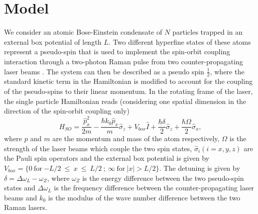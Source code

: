 \documentclass[12pt]{iopart}
\begin{document}
\section{Model}
\label{Sec:Model}

We consider an atomic Bose-Einstein condensate of $N$ particles trapped in an external box potential of length $L$. Two different hyperfine states of these atoms represent a pseudo-spin that is used to implement the spin-orbit coupling interaction through a two-photon Raman pulse from two counter-propagating laser beams \cite{spielman_2009}. The system can then be described as a pseudo spin $\frac{1}{2}$, where the standard kinetic term in the Hamiltonian is modified to  account for the coupling of the pseudo-spins to their linear momentum. In the rotating frame of the laser, the single particle Hamiltonian reads (considering one spatial dimension in the direction of the spin-orbit coupling only) \cite{Pitaevskiistringari2016}
\begin{equation}
    H_{SO}=\frac{\hat{p}_x^2}{2m}-\frac{\hbar k_0 \hat{p}_x}{m}\hat{\sigma}_z+V_{{box}}\hat{I}+\frac{\hbar \delta}{2}\hat{\sigma}_z+\frac{\hbar \Omega}{2}
    \hat{\sigma}_x,
\end{equation}
where  ${p}$ and $m$ are the momentum and mass of the atom respectively,  $\Omega$ is the strength of the laser beams which couple the two spin states, $\hat\sigma_i (i=x,y,z)$ are the Pauli spin operators and the external box potential is given by $V_{box}=\{0~\textrm{for}~{-L/2}~\leq~x~\leq~L/2~; ~\infty~\textrm{for}~|x|>L/2\}$. The detuning is  given by $\delta=\Delta \omega_L-\omega_Z$, where $\omega_Z$ is the energy difference between the two pseudo-spin states and $\Delta \omega_L$ is the frequency difference between the counter-propagating laser beams and $k_0$ is the modulus of the wave number difference between the two Raman lasers.
\end{document}

